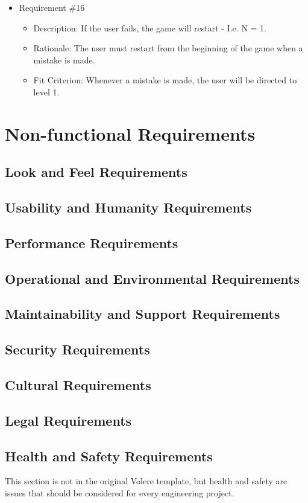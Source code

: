 \documentclass[12pt, titlepage]{article}
\begin{document}
\begin{itemize}
\item Requirement \#16
\begin{itemize}
\item Description: If the user fails, the game will restart - I.e. N = 1.
\item Rationale: The user must restart from the beginning of the game when a mistake is made.
\item Fit Criterion: Whenever a mistake is made, the user will be directed to level 1.
\end{itemize}

\end{itemize}


\section{Non-functional Requirements}
\subsection{Look and Feel Requirements}
\subsection{Usability and Humanity Requirements}
\subsection{Performance Requirements}
\subsection{Operational and Environmental Requirements}
\subsection{Maintainability and Support Requirements}
\subsection{Security Requirements}
\subsection{Cultural Requirements}
\subsection{Legal Requirements}
\subsection{Health and Safety Requirements}
This section is not in the original Volere template, but health and safety are
issues that should be considered for every engineering project.
\end{document}
